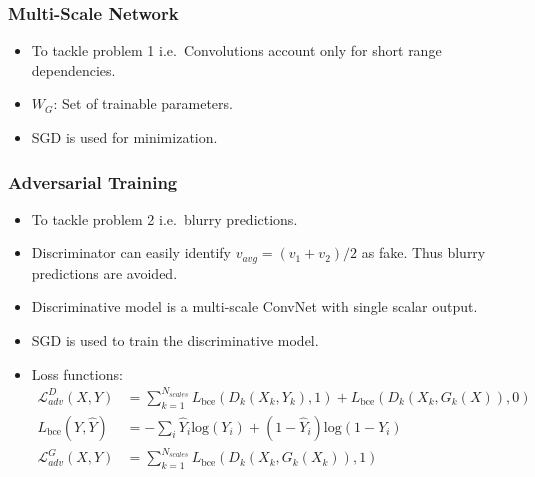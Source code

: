 \documentclass{article}
\begin{document}
    \subsubsection{Multi-Scale Network}\label{subsubsec:Deep_Multi_Scale_Video_Prediction_Beyond_Mean_Square_Error:multi-scale-network}
    \begin{itemize}
        \item To tackle problem 1 i.e.\ Convolutions account only for short range dependencies.
        \item $W_G$: Set of trainable parameters.
        \item SGD is used for minimization.
    \end{itemize}

    \subsubsection{Adversarial Training}\label{subsubsec:Deep_Multi_Scale_Video_Prediction_Beyond_Mean_Square_Error:adversarial-training}
    \begin{itemize}
        \item To tackle problem 2 i.e.\ blurry predictions.
        \item Discriminator can easily identify $v_{avg}=(v_1+v_2)/2$ as fake.
        Thus blurry predictions are avoided.
        \item Discriminative model is a multi-scale ConvNet with single scalar output.
        \item SGD is used to train the discriminative model.
        \item Loss functions: \\
        \begin{align*}
            \mathcal{L}_{adv}^D(X,Y) &= \sum_{k=1}^{N_{scales}} L_{\textrm{bce}}(D_k(X_k,Y_k), 1) + L_{\textrm{bce}}(D_k(X_k, G_k(X)), 0) \\
            L_{\textrm{bce}}(Y, \hat{Y}) &= - \sum_i \hat{Y}_i \textrm{log}(Y_i) + (1- \hat{Y}_i) \textrm{log}(1-Y_i) \\
            \mathcal{L}_{adv}^G(X,Y) &= \sum_{k=1}^{N_{scales}} L_{\textrm{bce}}(D_k(X_k, G_k(X_k)), 1) \\
        \end{align*}
    \end{itemize}
\end{document}
